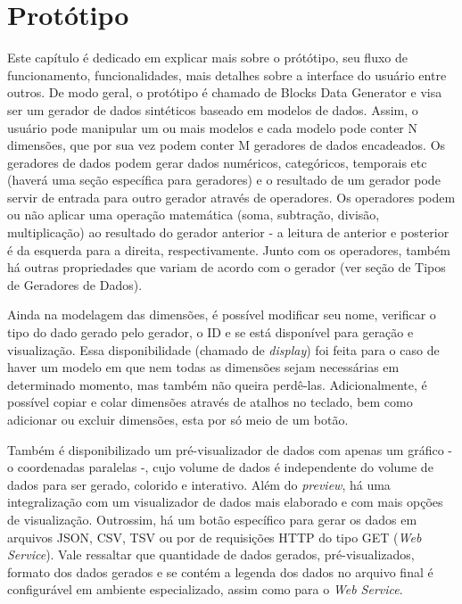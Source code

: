 \documentclass[
	12pt,				%
	openright,			%
	twoside,			%
	a4paper,			%
	english,			%
	brazil				%
	]{abntex2}
\begin{document}
\chapter{Protótipo}
	Este capítulo é dedicado em explicar mais sobre o prótótipo, seu fluxo de funcionamento, funcionalidades, mais detalhes sobre a interface do usuário entre outros.
	De modo geral, o protótipo é chamado de Blocks Data Generator e visa ser um gerador de dados sintéticos baseado em modelos de dados.
	Assim, o usuário pode manipular um ou mais modelos e cada modelo pode conter N dimensões, que por sua vez podem conter M geradores de dados encadeados.
	Os geradores de dados podem gerar dados numéricos, categóricos, temporais etc (haverá uma seção específica para geradores) e o resultado de um gerador pode servir de entrada para outro gerador através de operadores.
	Os operadores podem ou não aplicar uma operação matemática (soma, subtração, divisão, multiplicação) ao resultado do gerador anterior - a leitura de anterior e posterior é da esquerda para a direita, respectivamente.
	Junto com os operadores, também há outras propriedades que variam de acordo com o gerador (ver seção de Tipos de Geradores de Dados).
	\par
	Ainda na modelagem das dimensões, é possível modificar seu nome, verificar o tipo do dado gerado pelo gerador, o ID e se está disponível para geração e visualização.
	Essa disponibilidade (chamado de \emph{display}) foi feita para o caso de haver um modelo em que nem todas as dimensões sejam necessárias em determinado momento, mas também não queira perdê-las.
	Adicionalmente, é possível copiar e colar dimensões através de atalhos no teclado, bem como adicionar ou excluir dimensões, esta por só meio de um botão.
	\par
	Também é disponibilizado um pré-visualizador de dados com apenas um gráfico - o coordenadas paralelas -, cujo volume de dados é independente do volume de dados para ser gerado, colorido e interativo.
	Além do \emph{preview}, há uma integralização com um visualizador de dados mais elaborado e com mais opções de visualização.
	Outrossim, há um botão específico para gerar os dados em arquivos JSON, CSV, TSV ou por de requisições HTTP do tipo GET (\emph{Web Service}).
	Vale ressaltar que quantidade de dados gerados, pré-visualizados, formato dos dados gerados e se contém a legenda dos dados no arquivo final é configurável em ambiente especializado, assim como para o \emph{Web Service}.
	\par
\end{document}
